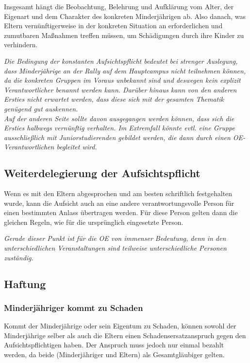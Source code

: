 \documentclass[a4paper,11pt]{scrartcl} %
\begin{document}
Insgesamt hängt die Beobachtung, Belehrung und Aufklärung vom Alter, der Eigenart und dem Charakter des konkreten Minderjährigen ab. Also danach, was Eltern vernünftigerweise in der konkreten Situation an erforderlichen und zumutbaren Maßnahmen treffen müssen, um Schädigungen durch ihre Kinder zu verhindern.

\textit{Die Bedingung der konstanten Aufsichtspflicht bedeutet bei strenger Auslegung, dass Minderjährige an der Rally auf dem Hauptcampus nicht teilnehmen können, da die konkreten Gruppen im Voraus unbekannt sind und deswegen kein explizit Verantwortlicher benannt werden kann. Darüber hinaus kann von den anderen Ersties nicht erwartet werden, dass diese sich mit der gesamten Thematik genügend gut auskennen.\\
Auf der anderen Seite sollte davon ausgegangen werden können, dass sich die Ersties halbwegs vernünftig verhalten. Im Extremfall könnte evtl. eine Gruppe ausschließlich mit Juniorstudierenden gebildet werden, die dann durch einen OE-Verantwortlichen begleitet wird.}

\subsection{Weiterdelegierung der Aufsichtspflicht}

Wenn es mit den Eltern abgesprochen und am besten schriftlich festgehalten wurde, kann die Aufsicht auch an eine andere verantwortungsvolle Person für einen bestimmten Anlass übertragen werden. Für diese Person gelten dann die gleichen Regeln, wie für die ursprünglich eingesetzte Person.

\textit{Gerade dieser Punkt ist für die OE von immenser Bedeutung, denn in den unterschiedlichen Veranstaltungen sind teilweise unterschiedliche Personen zuständig.}

\subsection{Haftung}

\subsubsection*{Minderjähriger kommt zu Schaden}

Kommt der Minderjährige oder sein Eigentum zu Schaden, können sowohl der Minderjährige selber als auch die Eltern einen Schadensersatzanspruch gegen den Aufsichtspflichtigen haben. Der Anspruch muss jedoch nur einmal bezahlt werden, da beide (Minderjähriger und Eltern) als Gesamtgläubiger gelten.
\end{document}
